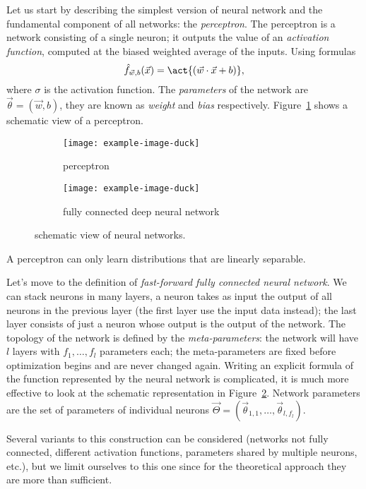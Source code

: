 Let us start by describing the simplest version of neural network and the fundamental component of all networks: the \emph{perceptron}.
The perceptron is a network consisting of a single neuron; it outputs the value of an \emph{activation function}, computed at the biased weighted average of the inputs.
Using formulas
\[
  \hat{f}_{\vec{w},b}{(\vec{x})} = \act{\left(\vec{w}\cdot\vec{x}+b\right)},
\]
where \(\sigma\) is the activation function. The \emph{parameters} of the network are \(\vec{\theta}=(\vec{w},b)\),
they are known as \emph{weight} and \emph{bias} respectively.
Figure~\ref{fig:nn_perceptron} shows a schematic view of a perceptron.
\begin{figure}
  \centering
  \begin{subfigure}{0.345\textwidth}
    \texttt{[image: example-image-duck]}
    \caption{perceptron}
    \label{fig:nn_perceptron}
  \end{subfigure}
  \begin{subfigure}{0.645\textwidth}
    \texttt{[image: example-image-duck]}
    \caption{fully connected deep neural network}
    \label{fig:nn_ffnn}
  \end{subfigure}
  \caption{
    schematic view of neural networks.
  }
  \label{fig:nn}
\end{figure}
A perceptron can only learn distributions that are linearly separable.

Let's move to the definition of \emph{fast-forward fully connected neural network}.
We can stack neurons in many layers, a neuron takes as input the output of all neurons in the previous layer (the first layer use the input data instead);
the last layer consists of just a neuron whose output is the output of the network.
The topology of the network is defined by the \emph{meta-parameters}: the network will have \(l\) layers with \(f_1,\dots,f_l\) parameters each;
the meta-parameters are fixed before optimization begins and are never changed again.
Writing an explicit formula of the function represented by the neural network is complicated,
it is much more effective to look at the schematic representation in Figure~\ref{fig:nn_ffnn}.
Network parameters are the set of parameters of individual neurons \(\vec{\Theta} = (\vec{\theta}_{1,1},\dots,\vec{\theta}_{l,f_l})\).

Several variants to this construction can be considered (networks not fully connected, different activation functions, parameters shared by multiple neurons, etc.),
but we limit ourselves to this one since for the theoretical approach they are more than sufficient.
